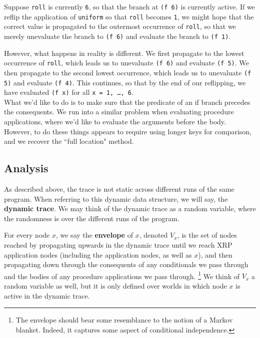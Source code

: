 \documentclass[10pt]{article}
\begin{document}
Suppose {\tt roll} is currently {\tt 6}, so that the branch at {\tt (f 6)} is currently active.  If we reflip the application of {\tt uniform} so that {\tt roll} becomes {\tt 1}, we might hope that the correct value is propagated to the outermost occurrence of {\tt roll}, so that we merely unevaluate the branch to {\tt (f 6)} and evaluate the branch to {\tt (f 1)}.  

However, what happens in reality is different.  We first propagate to the lowest occurrence of {\tt roll}, which leads us to unevaluate {\tt (f 6)} and evaluate {\tt (f 5)}. We then propagate to the second lowest occurrence, which leads us to unevaluate {\tt (f 5)} and evaluate {\tt (f 4)}.  This continues, so that by the end of our reflipping, we have evaluated {\tt (f x)} for all {\tt x = 1, \ldots, 6}.  \\

What we'd like to do is to make sure that the predicate of an if branch precedes the consequents.  We run into a similar problem when evaluating procedure applications, where we'd like to evaluate the arguments before the body.  However, to do these things appears to require using longer keys for comparison, and we recover the ``full location" method.  


\subsection{Analysis}

As described above, the trace is not static across different runs of the same program.  When referring to this dynamic data structure, we will say, the {\bf dynamic trace}.  We may think of the dynamic trace as a random variable, where the randomness is over the different runs of the program.  %

For every node $x$, we say the {\bf envelope} of $x$, denoted $V_x$, is the set of nodes reached by propagating upwards in the dynamic trace until we reach XRP application nodes (including the application nodes, as well as $x$), and then propagating down through the consequents of any conditionals we pass through and the bodies of any procedure applications we pass through.  \footnote{The envelope should bear some resemblance to the notion of a Markov blanket.   Indeed, it captures some aspect of conditional independence.}  We think of $V_x$ a random variable as well, but it is only defined over worlds in which node $x$ is active in the dynamic trace.  
\end{document}
